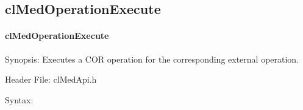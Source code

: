 \begin{flushleft}
\subsection{clMedOperationExecute}
\hypertarget{pagemed103}{}\paragraph{cl\-Med\-Operation\-Execute}\label{pagemed103}
\begin{Desc}
\item[Synopsis:]Executes a COR operation for the corresponding external operation.\end{Desc}
\begin{Desc}
\item[Header File:]clMedApi.h\end{Desc}
\begin{Desc}
\item[Syntax:]


\end{Desc}
\end{flushleft}
